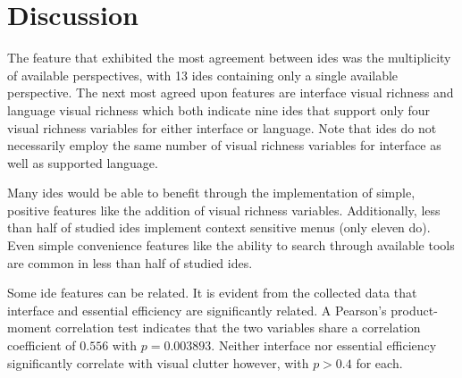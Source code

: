 \section{Discussion}
\label{sec:discussion}

The feature that exhibited the most agreement between \acp{ide} was the
multiplicity of available perspectives, with 13 \acp{ide} containing only
a single available perspective. The next most agreed upon features are
interface visual richness and language visual richness which both indicate
nine \acp{ide} that support only four visual richness variables for either
interface or language. Note that \acp{ide} do not necessarily employ the
same number of visual richness variables for interface as well as supported
language.

Many \acp{ide} would be able to benefit through the implementation of
simple, positive features like the addition of visual richness variables.
Additionally, less than half of studied \acp{ide} implement context
sensitive menus (only eleven do). Even simple convenience features like the
ability to search through available tools are common in less than half of
studied \acp{ide}.

Some \ac{ide} features can be related. It is evident from the collected
data that interface and essential efficiency are significantly related. A
Pearson's product-moment correlation test indicates that the two variables
share a correlation coefficient of $0.556$ with $p=0.003893$. Neither
interface nor essential efficiency significantly correlate with visual
clutter however, with $p>0.4$ for each.

